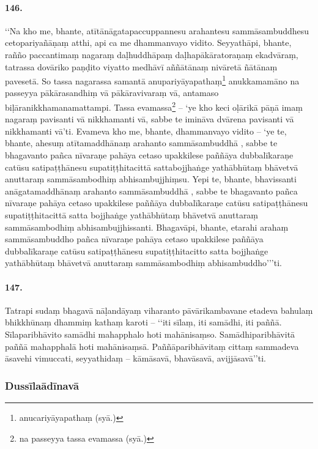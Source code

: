 \paragraph{146.} ‘‘Na kho me, bhante, atītānāgatapaccuppannesu arahantesu sammāsambuddhesu cetopariyañāṇaṃ atthi, api ca me dhammanvayo vidito. Seyyathāpi, bhante, rañño paccantimaṃ nagaraṃ daḷhuddhāpaṃ daḷhapākāratoraṇaṃ ekadvāraṃ, tatrassa dovāriko paṇḍito viyatto medhāvī aññātānaṃ nivāretā ñātānaṃ pavesetā. So tassa nagarassa samantā anupariyāyapathaṃ\footnote{anucariyāyapathaṃ (syā.)} anukkamamāno na passeyya pākārasandhiṃ vā pākāravivaraṃ vā, antamaso biḷāranikkhamanamattampi. Tassa evamassa\footnote{na passeyya tassa evamassa (syā.)} – ‘ye kho keci oḷārikā pāṇā imaṃ nagaraṃ pavisanti vā nikkhamanti vā, sabbe te imināva dvārena pavisanti vā nikkhamanti vā’ti. Evameva kho me, bhante, dhammanvayo vidito – ‘ye te, bhante, ahesuṃ atītamaddhānaṃ arahanto sammāsambuddhā , sabbe te bhagavanto pañca nīvaraṇe pahāya cetaso upakkilese paññāya dubbalīkaraṇe catūsu satipaṭṭhānesu supatiṭṭhitacittā sattabojjhaṅge yathābhūtaṃ bhāvetvā anuttaraṃ sammāsambodhiṃ abhisambujjhiṃsu. Yepi te, bhante, bhavissanti anāgatamaddhānaṃ arahanto sammāsambuddhā , sabbe te bhagavanto pañca nīvaraṇe pahāya cetaso upakkilese paññāya dubbalīkaraṇe catūsu satipaṭṭhānesu supatiṭṭhitacittā satta bojjhaṅge yathābhūtaṃ bhāvetvā anuttaraṃ sammāsambodhiṃ abhisambujjhissanti. Bhagavāpi, bhante, etarahi arahaṃ sammāsambuddho pañca nīvaraṇe pahāya cetaso upakkilese paññāya dubbalīkaraṇe catūsu satipaṭṭhānesu supatiṭṭhitacitto satta bojjhaṅge yathābhūtaṃ bhāvetvā anuttaraṃ sammāsambodhiṃ abhisambuddho’’’ti.

\paragraph{147.} Tatrapi sudaṃ bhagavā nāḷandāyaṃ viharanto pāvārikambavane etadeva bahulaṃ bhikkhūnaṃ dhammiṃ kathaṃ karoti – ‘‘iti sīlaṃ, iti samādhi, iti paññā. Sīlaparibhāvito samādhi mahapphalo hoti mahānisaṃso. Samādhiparibhāvitā paññā mahapphalā hoti mahānisaṃsā. Paññāparibhāvitaṃ cittaṃ sammadeva āsavehi vimuccati, seyyathidaṃ – kāmāsavā, bhavāsavā, avijjāsavā’’ti.

\subsubsection{Dussīlaādīnavā}

